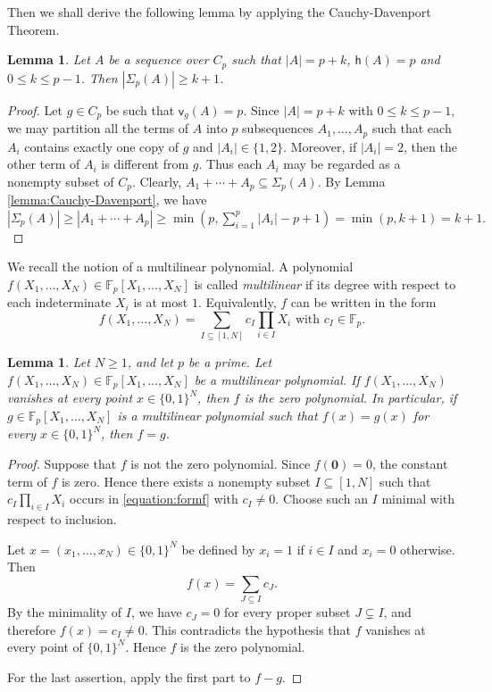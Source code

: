 \documentclass[a4paper, 12pt]{article}
\newtheorem{lemma}[theorem]{Lemma}
\theoremstyle{definition}
\begin{document}
Then we shall derive the following lemma by applying the Cauchy-Davenport Theorem.



\begin{lemma}\label{lemma:height}
Let $A$ be a sequence over $C_p$ such that
$|A|=p+k$, $\mathsf h(A)=p$ and $0\le k\le p-1$.
Then
$|\Sigma_p(A)|\ge k+1$.
\end{lemma}

\begin{proof} Let $g\in C_p$ be such that $\mathsf v_g(A)=p$. Since
$|A|=p+k$ with $0\leq k\leq p-1$, we may partition all the terms of
$A$ into $p$ subsequences $A_1,\ldots,A_p$ such that each $A_i$
contains exactly one copy of $g$ and $|A_i|\in \{1,2\}$.
Moreover, if $|A_i|=2$, then the other term of $A_i$ is different
from $g$. Thus each $A_i$ may be regarded as a nonempty subset of
$C_p$. Clearly,
$A_1+\cdots+A_p\subseteq\Sigma_p(A).$
By Lemma \ref{lemma:Cauchy-Davenport}, we have
$|\Sigma_p(A)|
\ge |A_1+\cdots+A_p|
\ge
\min\left(p,\sum_{i=1}^p|A_i|-p+1\right)
=\min(p,k+1)
=k+1.$
\end{proof}


We recall the notion of a multilinear polynomial. A polynomial
$f(X_1,\ldots,X_N)\in\mathbb F_p[X_1,\ldots,X_N]$ is called \emph{multilinear}
if its degree with respect to each indeterminate $X_i$ is at most $1$.
Equivalently, $f$ can be written in the form
\begin{equation}\label{equation:formf}
f(X_1,\ldots,X_N)=
\sum_{I\subseteq[1,N]}
c_I\prod_{i\in I}X_i \mbox{ with } c_I\in\mathbb F_p.
\end{equation}


\begin{lemma}\label{lemma:multilinearreduction} Let $N\ge 1$, and let $p$ be a prime. Let $f(X_1,\ldots,X_N)\in \mathbb{F}_p[X_1,\ldots,X_N]$ be a multilinear polynomial. If $f(X_1,\ldots,X_N)$ vanishes at every point $x\in\{0,1\}^N$, then $f$ is the zero polynomial. In particular, if $g\in \mathbb{F}_p[X_1,\ldots,X_N]$ is a multilinear polynomial such that $f(x)=g(x)$ for every $x\in\{0,1\}^N$, then $f=g$.
\end{lemma}

\begin{proof} Suppose that $f$ is not the zero polynomial. Since $f(\mathbf 0)=0$,
the constant term of $f$ is zero. Hence there exists a nonempty subset
$I\subseteq[1,N]$ such that
$c_I\prod_{i\in I}X_i$ occurs in \eqref{equation:formf} with
$c_I\ne0$. Choose such an $I$ minimal with respect to inclusion.

Let $x=(x_1,\ldots,x_N)\in\{0,1\}^N$ be defined by
$x_i=1$ if $i\in I$ and $x_i=0$ otherwise. Then
$$f(x)=\sum_{J\subseteq I}c_J.$$
By the minimality of $I$, we have $c_J=0$ for every proper subset
$J\subsetneq I$, and therefore $f(x)=c_I\ne0$. This contradicts the
hypothesis that $f$ vanishes at every point of $\{0,1\}^N$.
Hence $f$ is the zero polynomial.

For the last assertion, apply the first part to $f-g$.
\end{proof}
\end{document}
